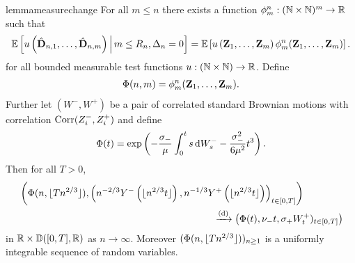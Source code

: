\begin{restatable}{lemma}{measurechange}
    \label{lem:measure-change}
    For all $m \leq n$ there exists a function $\phi^n_m: ({\mathbb N} \times {\mathbb N})^m \to {\mathbb R}$ such that 
    \begin{equation*}
        {\mathbb E}\left[ 
            u\left( 
                \hat{{\mathbf D}}_{n, 1}, \ldots, \hat{{\mathbf D}}_{n, m}
             \right) 
             \,\middle\vert\,
             m \leq R_n, \Delta_n = 0
         \right]
        =
        {\mathbb E}\left[ 
            u\left( 
                {\mathbf Z}_1, \ldots, {\mathbf Z}_m
             \right)
             \phi^n_m({\mathbf Z}_1, \ldots, {\mathbf Z}_m)
         \right].
    \end{equation*}
    for all bounded measurable test functions $u: ({\mathbb N} \times {\mathbb N}) \to {\mathbb R}$. Define
    \begin{align*}
        \Phi(n, m) = \phi^n_m({\mathbf Z}_1, \ldots, {\mathbf Z}_m).
    \end{align*}
    Further let $(W^-, W^+)$ be a pair of correlated standard Brownian motions with correlation $\operatorname{Corr}(Z^-_i, Z^+_i)$ and define
    \begin{equation*}
        \Phi(t) = \exp \left( 
            - \frac{\sigma_-}{\mu} \int_0^t s \mathop{}\!\mathrm{d} W^-_s - \frac{\sigma_-^2}{6 \mu^2} t^3
         \right).
    \end{equation*}
    Then for all $T > 0$,
    \begin{align*}
        &\left( 
            \Phi(n, \floor{T n^{2/3}}),
            \left(
                n^{-2/3} Y^-\left( \floor{n^{2/3} t} \right),
                n^{-1/3} Y^+\left( \floor{n^{2/3} t} \right)
            \right)_{t \in [0, T]}
        \right) \\
        & \hspace{20em} \todist \left( 
            \Phi(t),
            \nu_- t, \sigma_+ W^+_t)_{t \in [0, T]}
        \right)
    \end{align*}
    in ${\mathbb R} \times {\mathbb D}([0, T], {\mathbb R})$ as $n \to \infty$. Moreover $(\Phi(n, \lfloor T n^{2/3}\rfloor))_{n \geq 1}$ is a uniformly integrable sequence of random variables.
\end{restatable}